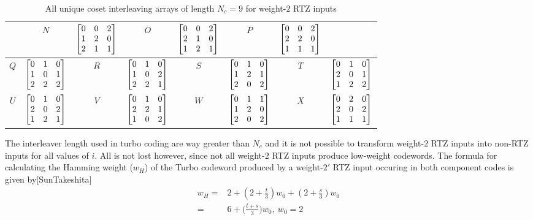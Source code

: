 \documentclass[11pt, oneside, dvipdfmx]{book}
\begin{document}
\begin{table}[h!]
\begin{tabular}{|c || c | c|| c|c || c | c|| c|}
 &
  $N$ & $\begin{bmatrix}0 & 0 & 2 \cr 1 & 2 & 0 \cr 2 & 1 & 1 \end{bmatrix}$ 
 &
 $O$ & $\begin{bmatrix}0 & 0 & 2 \cr 2 & 1 & 0 \cr 1 & 2 & 1\end{bmatrix}$ 
&
 $P$ & $\begin{bmatrix}0 & 0 & 2 \cr 2 & 2 & 0 \cr 1 & 1 & 1\end{bmatrix}$\\ 
 \hline
 $Q$ & $\begin{bmatrix}0 & 1 & 0 \cr 1 & 0 & 1 \cr 2 & 2 & 2 \end{bmatrix}$
&
  $R$ & $\begin{bmatrix}0 & 1 & 0 \cr 1 & 0 & 2 \cr 2 & 2 & 1\end{bmatrix}$ 
&
 $S$ & $\begin{bmatrix}0 & 1 & 0 \cr 1 & 2 & 1 \cr 2 & 0 & 2 \end{bmatrix}$
 &
 $T$ & $\begin{bmatrix}0 & 1 & 0 \cr 2 & 0 & 1 \cr 1 & 2 & 2\end{bmatrix}$\\ 
 \hline
 $U$ & $\begin{bmatrix}0 & 1 & 0 \cr 2 & 0 & 2 \cr 1 & 2 & 1\end{bmatrix}$ 
 &
 $V$ & $\begin{bmatrix}0 & 1 & 0 \cr 2 & 2 & 1 \cr 1 & 0 & 2\end{bmatrix}$ 
 &
 $W$ & $\begin{bmatrix}0 & 1 & 1 \cr 1 & 2 & 0 \cr 2 & 0 & 2 \end{bmatrix}$
 &
 $X$ & $\begin{bmatrix}0 & 2 & 0 \cr 2 & 0 & 2 \cr 1 & 1 & 1\end{bmatrix}$\\ 
   \hline

  \end{tabular}
\caption{All unique coset interleaving arrays of length $N_c =9$ for weight-$2$ RTZ inputs}
\label{tb1}
\end{table}

The interleaver length used in turbo coding are way greater than $N_c$ and it is not possible to transform weight-$2$ RTZ inputs into non-RTZ inputs for all values of $i$. All is not lost however, since not all weight-$2$ RTZ inputs produce low-weight codewords. 
The formula for calculating the Hamming weight ($w_H$) of the Turbo codeword produced by a weight-$2'$ RTZ input occuring in both component codes is given by[SunTakeshita] 
\begin{equation}
\begin{split}
w_H=&2+(2 + \frac{t}{3} )w_0+ (2 + \frac{s}{3})w_0\\
=&6+\Big(\frac{t+s}{3}\Big)w_0,~w_0=2
\end{split}
\label{eq3}
\end{equation}
\end{document}
